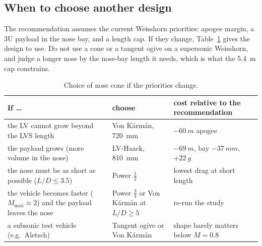 \subsection{When to choose another design}

The recommendation assumes the current Weisshorn priorities: apogee margin, a 3U payload in the
nose bay, and a length cap. If they change, Table~\ref{tab:alternatives} gives the design to use.
Do not use a cone or a tangent ogive on a supersonic Weisshorn, and judge a longer nose by the nose-bay length it needs, which is what the \SI{5.4}{m} cap constrains.

\begin{table}[H]
\centering
\caption{Choice of nose cone if the priorities change.}
\label{tab:alternatives}
\small
\begin{tabular}{@{}>{\raggedright\arraybackslash}p{6.3cm}>{\raggedright\arraybackslash}p{3.6cm}>{\raggedright\arraybackslash}p{5.3cm}@{}}
\toprule
If \dots & choose & cost relative to the recommendation \\
\midrule
the LV cannot grow beyond the LVS length & Von K\'arm\'an, \SI{720}{mm} & $-\SI{60}{m}$ apogee \\
the payload grows (more volume in the nose) & LV-Haack, \SI{810}{mm} & $-\SI{69}{m}$, bay $-\SI{37}{mm}$, $+\SI{22}{g}$ \\
the nose must be as short as possible ($L/D \leq 3.5$) & Power $\tfrac12$ & lowest drag at short length \\
the vehicle becomes faster ($M_{\max} \approx 2$) and the payload leaves the nose & Power $\tfrac34$ or Von K\'arm\'an at $L/D \geq 5$ & re-run the study \\
a subsonic test vehicle (e.g.\ Aletsch) & Tangent ogive or Von K\'arm\'an & shape barely matters below $M = 0.8$ \\
\bottomrule
\end{tabular}
\end{table}
